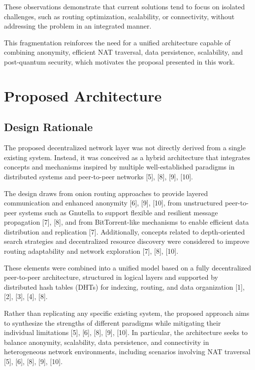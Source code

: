 \documentclass[12pt,a4paper]{article}
\begin{document}
These observations demonstrate that current solutions tend to focus on isolated challenges, such as routing optimization, scalability, or connectivity, without addressing the problem in an integrated manner.

This fragmentation reinforces the need for a unified architecture capable of combining anonymity, efficient NAT traversal, data persistence, scalability, and post-quantum security, which motivates the proposal presented in this work.







\clearpage
\section{Proposed Architecture}


\subsection{Design Rationale}

The proposed decentralized network layer was not directly derived from a single existing system. Instead, it was conceived as a hybrid architecture that integrates concepts and mechanisms inspired by multiple well-established paradigms in distributed systems and peer-to-peer networks [5], [8], [9], [10].

The design draws from onion routing approaches to provide layered communication and enhanced anonymity [6], [9], [10], from unstructured peer-to-peer systems such as Gnutella to support flexible and resilient message propagation [7], [8], and from BitTorrent-like mechanisms to enable efficient data distribution and replication [7]. Additionally, concepts related to depth-oriented search strategies and decentralized resource discovery were considered to improve routing adaptability and network exploration [7], [8], [10].

These elements were combined into a unified model based on a fully decentralized peer-to-peer architecture, structured in logical layers and supported by distributed hash tables (DHTs) for indexing, routing, and data organization [1], [2], [3], [4], [8].

Rather than replicating any specific existing system, the proposed approach aims to synthesize the strengths of different paradigms while mitigating their individual limitations [5], [6], [8], [9], [10]. In particular, the architecture seeks to balance anonymity, scalability, data persistence, and connectivity in heterogeneous network environments, including scenarios involving NAT traversal [5], [6], [8], [9], [10].
\end{document}
